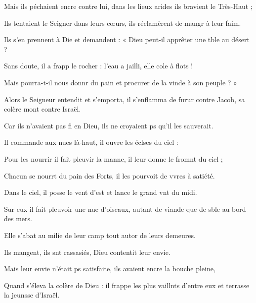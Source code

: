 \item Mais ils péchaient encre contre lui,\psstar{} dans les lieux arides ils bravient le Très-Haut ;
\item Ils tentaient le Seigner dans leurs cœurs,\psstar{} ils réclamèrent de mangr à leur faim.
\item Ils s’en prennent à Die et demandent :\psstar{} « Dieu peut-il apprêter une tble au désert ?
\item Sans doute, il a frapp le rocher :\psstar{} l’eau a jailli, elle cole à flots ! 
\item Mais pourra-t-il nous donnr du pain\psstar{} et procurer de la vinde à son peuple ? »
\item Alors le Seigneur entendit et s’emporta,\pscross{} il s’enflamma de furur contre Jacob,\psstar{} sa colère mont contre Israël.
\item Car ils n’avaient pas fi en Dieu,\psstar{} ils ne croyaient ps qu’il les sauverait.
\item Il commande aux nues là-haut,\psstar{} il ouvre les éclses du ciel :
\item Pour les nourrir il fait pleuvir la manne,\psstar{} il leur donne le fromnt du ciel ;
\item Chacun se nourrt du pain des Forts,\psstar{} il les pourvoit de vvres à satiété.
\item Dans le ciel, il posse le vent d’est\psstar{} et lance le grand vnt du midi.
\item Sur eux il fait pleuvoir une nue d’oiseaux,\psstar{} autant de viande que de sble au bord des mers.
\item Elle s’abat au milie de leur camp\psstar{} tout autor de leurs demeures.
\item Ils mangent, ils snt rassasiés,\psstar{} Dieu contentit leur envie.
\item Mais leur envie n’était ps satisfaite,\psstar{} ils avaient encre la bouche pleine,
\item Quand s’éleva la colère de Dieu :\pscross{} il frappe les plus vaillnts d’entre eux\psstar{} et terrasse la jeunsse d’Israël.